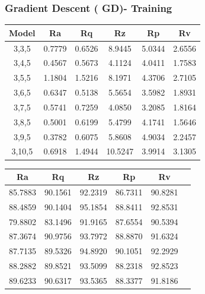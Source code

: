 \documentclass[suppldata]{interact}
\begin{document}
\newpage
\begin{landscape}
\subsubsection{ Gradient Descent ( GD)- Training}
  \begin{minipage}{0.35\textwidth}
  \small
 \centering
    \begin{tabular}{|c|c|c|c|c|c|}
    \hline
        Model & Ra &  Rq &  Rz &  Rp & Rv \\ \hline
        3,3,5 & 0.7779 & 0.6526 & 8.9445 & 5.0344 & 2.6556 \\ \hline
        3,4,5 & 0.4567 & 0.5673 & 4.1124 & 4.0411 & 1.7583 \\ \hline
        3,5,5 & 1.1804 & 1.5216 & 8.1971 & 4.3706 & 2.7105 \\ \hline
        3,6,5 & 0.6347 & 0.5138 & 5.5654 & 3.5982 & 1.8931 \\ \hline
        3,7,5 & 0.5741 & 0.7259 & 4.0850 & 3.2085 & 1.8164 \\ \hline
        3,8,5 & 0.5001 & 0.6199 & 5.4799 & 4.1741 & 1.5646 \\ \hline
        3,9,5 & 0.3782 & 0.6075 & 5.8608 & 4.9034 & 2.2457 \\ \hline
        3,10,5 & 0.6918 & 1.4944 & 10.5247 & 3.9914 & 3.1305 \\ \hline
    \end{tabular}
        \label{tab:gdmsetr}
    \end{minipage}
   \hfill
   \begin{minipage}{0.30\textwidth}
   \small
\centering
    \centering
      \begin{tabular}{|c|c|c|c|c|c|}
    \hline
        Ra &  Rq &  Rz &  Rp & Rv \\ \hline
        85.7883 & 90.1561 & 92.2319 & 86.7311 & 90.8281 \\ \hline
        88.4859 & 90.1404 & 95.1854 & 88.8411 & 92.8531 \\ \hline
        79.8802 & 83.1496 & 91.9165 & 87.6554 & 90.5394 \\ \hline
        87.3674 & 90.9756 & 93.7972 & 88.8870 & 91.6324 \\ \hline
        87.7135 & 89.5326 & 94.8920 & 90.1051 & 92.2929 \\ \hline
        88.2882 & 89.8521 & 93.5099 & 88.2318 & 92.8523 \\ \hline
        89.6233 & 90.6317 & 93.5365 & 88.3377 & 91.8186 \\ \hline

\end{tabular}
\end{minipage}
\end{landscape}
\end{document}
